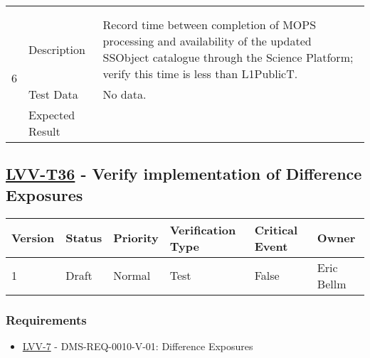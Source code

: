 \begin{longtable}[]{p{1.3cm}p{2cm}p{13cm}}
\begin{minipage}[t]{13cm}
{                    \vspace{\dp0}
                    } \end{minipage}
                \\ \hdashline


        \\ \midrule

            \multirow{3}{*}{ 6 } & Description &
            \begin{minipage}[t]{13cm}{\footnotesize
            Record time between completion of MOPS processing and availability of
the updated SSObject catalogue through the Science Platform; verify this
time is less than L1PublicT.

            \vspace{\dp0}
            } \end{minipage} \\ \cline{2-3}
            & Test Data &
            \begin{minipage}[t]{13cm}{\footnotesize
                No data.
                \vspace{\dp0}
            } \end{minipage} \\ \cline{2-3}
            & Expected Result &
        \\ \midrule
    \end{longtable}

\subsection{\href{https://jira.lsstcorp.org/secure/Tests.jspa\#/testCase/LVV-T36}{LVV-T36}
    - Verify implementation of Difference Exposures}\label{lvv-t36}

\begin{longtable}[]{llllll}
\toprule
Version & Status & Priority & Verification Type & Critical Event & Owner
\\\midrule
1 & Draft & Normal &
Test & False & Eric Bellm
\\\bottomrule
\end{longtable}

\subsubsection{Requirements}
\begin{itemize}
\item \href{https://jira.lsstcorp.org/browse/LVV-7}{LVV-7} - DMS-REQ-0010-V-01: Difference Exposures
\end{itemize}

